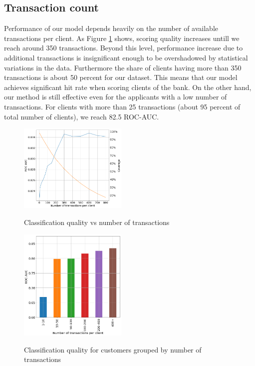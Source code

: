 \documentclass[sigconf]{acmart}
\begin{document}
\subsection{Transaction count}

Performance of our model depends heavily on the number of available transactions per client. As Figure \ref{fig-tc} shows, scoring quality increases untill we reach around 350 transactions. Beyond this level, performance increase due to additional transactions is insignificant enough to be overshadowed by statistical variations in the data. Furthermore the share of clients having more than 350 transactions is about 50 percent for our dataset. This means that our model achieves significant hit rate when scoring clients of the bank. On the other hand, our method is still effective even for the applicants with a low number of transactions. For clients with more than 25 transactions (about 95 percent of total number of clients), we reach 82.5 ROC-AUC. 

\begin{figure}[ht]
  \caption{Classification quality vs number of transactions}
  \includegraphics[width=0.46\textwidth]{figures/information-vs-accuracy-max.png}
  \label{fig-tc}
\end{figure}

\begin{figure}[ht]
  \caption{Classification quality for customers grouped by number of transactions}
  \includegraphics[width=0.46\textwidth]{figures/information-vs-accuracy-bins.png}
  \label{fig-tcb}
\end{figure}
\end{document}
